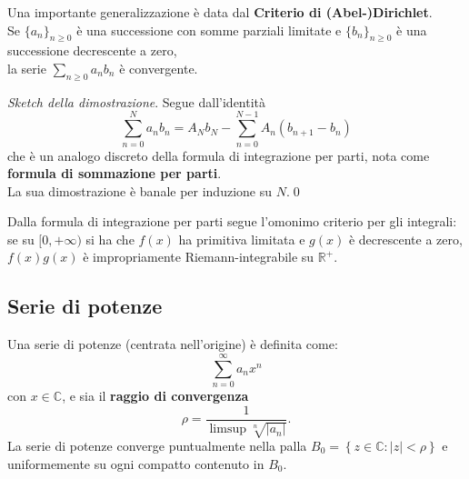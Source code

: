 \documentclass[a4paper,twoside]{article}
\newcommand{\C}{\mathbb{C}}
\newcommand{\R}{\mathbb{R}}
\theoremstyle{definition}
\numberwithin{theorem}{section}
\begin{document}
Una importante generalizzazione è data dal \textbf{Criterio di (Abel-)Dirichlet}.\\
Se $\{a_n\}_{n\geq 0}$ è una successione con somme parziali limitate e $\{b_n\}_{n\geq 0}$ è una successione decrescente a zero,\\ la serie $\sum_{n\geq 0}a_n b_n$ è convergente.

\emph{Sketch della dimostrazione}. Segue dall'identità
$$ \sum_{n=0}^{N}a_n b_n = A_N b_N - \sum_{n=0}^{N-1} A_n (b_{n+1}-b_n) $$
che è un analogo discreto della formula di integrazione per parti, nota come \textbf{formula di sommazione per parti}.\\ La sua dimostrazione è banale per induzione su $N$.\qed

Dalla formula di integrazione per parti segue l'omonimo criterio per gli integrali: se su $[0,+\infty)$ si ha che $f(x)$ ha primitiva limitata e $g(x)$ è decrescente a zero, $f(x)g(x)$ è impropriamente Riemann-integrabile su $\R^+$.

\subsection{Serie di potenze}
Una serie di potenze (centrata nell'origine) è definita come:
$$\sum_{n=0}^{\infty}a_n x^n$$
con $x\in\C$, e sia il \textbf{raggio di convergenza} \\
$$\rho=\frac{1}{\limsup\sqrt[n]{|a_n|}}.$$
La serie di potenze converge puntualmente nella palla $B_0=\left\{z\in\C : |z|< \rho \right\}$ e uniformemente su ogni compatto contenuto in $B_0$.
\end{document}
